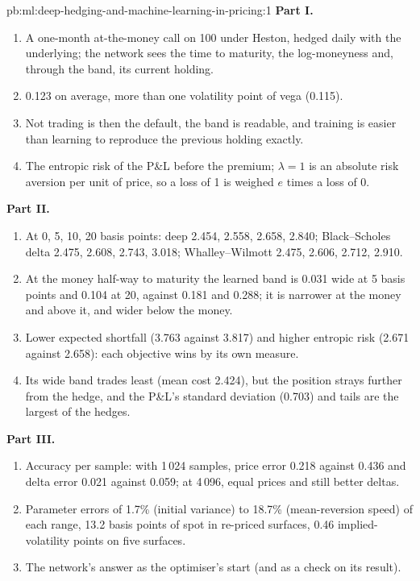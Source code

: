\begin{solution}{pb:ml:deep-hedging-and-machine-learning-in-pricing:1}
\textbf{Part I.}
\begin{enumerate}
\item A one-month at-the-money call on 100 under Heston, hedged daily with the underlying; the network sees the time to
maturity, the log-moneyness and, through the band, its current holding.
\item 0.123 on average, more than one volatility point of vega (0.115).
\item Not trading is then the default, the band is readable, and training is easier than learning to reproduce the previous
holding exactly.
\item The entropic risk of the P\&L before the premium; $\lambda = 1$ is an absolute risk aversion per unit of price, so a
loss of 1 is weighed $e$ times a loss of 0.
\end{enumerate}
\textbf{Part II.}
\begin{enumerate}[resume]
\item At 0, 5, 10, 20 basis points: deep 2.454, 2.558, 2.658, 2.840; Black--Scholes delta 2.475, 2.608, 2.743, 3.018;
Whalley--Wilmott 2.475, 2.606, 2.712, 2.910.
\item At the money half-way to maturity the learned band is 0.031 wide at 5 basis points and 0.104 at 20, against 0.181 and
0.288; it is narrower at the money and above it, and wider below the money.
\item Lower expected shortfall (3.763 against 3.817) and higher entropic risk (2.671 against 2.658): each objective wins by
its own measure.
\item Its wide band trades least (mean cost 2.424), but the position strays further from the hedge, and the P\&L's standard
deviation (0.703) and tails are the largest of the hedges.
\end{enumerate}
\textbf{Part III.}
\begin{enumerate}[resume]
\item Accuracy per sample: with 1\,024 samples, price error 0.218 against 0.436 and delta error 0.021 against 0.059; at 4\,096,
equal prices and still better deltas.
\item Parameter errors of 1.7\% (initial variance) to 18.7\% (mean-reversion speed) of each range, 13.2 basis points of spot in
re-priced surfaces, 0.46 implied-volatility points on five surfaces.
\item The network's answer as the optimiser's start (and as a check on its result).

\end{enumerate}
\end{solution}
